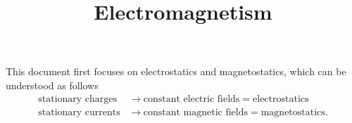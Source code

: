 \documentclass[11pt]{article}
\title{Electromagnetism}
\begin{document}
\maketitle
\maketitle
\tableofcontents

This document first focuses on electrostatics and magnetostatics, which can be understood as follows
\begin{align}
    \text{stationary charges} &\to \text{constant electric fields} = \text{electrostatics} \nonumber \\
    \text{stationary currents} &\to \text{constant magnetic fields} = \text{magnetostatics} .
\end{align}

\end{document}
